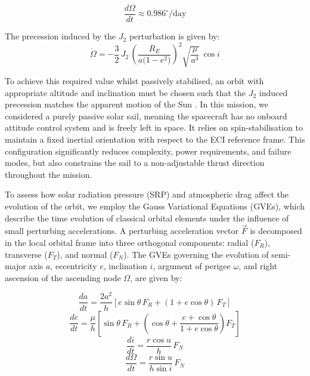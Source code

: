 \documentclass[final,3p,times,twocolumn]{elsarticle}
\begin{document}
\begin{equation}
\frac{d\Omega}{dt} \approx 0.986^\circ/\text{day}
\label{eq:RAANrate}
\end{equation}

\noindent The precession induced by the \( J_2 \) perturbation is given by:
\begin{equation}
\dot{\Omega}
  = -\frac{3}{2}\,J_2\,
      \left(\frac{R_{E}}{a\bigl(1-e^{2}\bigr)}\right)^{\!2}
      \sqrt{\frac{\mu}{a^{3}}}\,
      \cos i
\end{equation}

\noindent To achieve this required value whilst passively stabilised, an orbit with appropriate altitude and inclination must be chosen such that the \( J_2 \) induced precession matches the apparent motion of the Sun \citep{montenbruck2000}. In this mission, we considered a purely passive solar sail, meaning the spacecraft has no onboard attitude control system and is freely left in space. It relies on spin-stabilisation to maintain a fixed inertial orientation with respect to the ECI reference frame. This configuration significantly reduces complexity, power requirements, and failure modes, but also constrains the sail to a non-adjustable thrust direction throughout the mission.

\vspace{5pt}
\par\noindent To assess how solar radiation pressure (SRP) and atmospheric drag affect the evolution of the orbit, we employ the Gauss Variational Equations (GVEs), which describe the time evolution of classical orbital elements under the influence of small perturbing accelerations. A perturbing acceleration vector \( \vec{F} \) is decomposed in the local orbital frame into three orthogonal components: radial (\( F_R \)), transverse (\( F_T \)), and normal (\( F_N \)). The GVEs governing the evolution of semi-major axis \( a \), eccentricity \( e \), inclination \( i \), argument of perigee \( \omega \), and right ascension of the ascending node \( \Omega \), are given by:

\begin{equation}
\frac{da}{dt} = \frac{2a^2}{h} \left[ e \sin{\theta} \, F_R + (1 + e \cos{\theta}) \, F_T \right]
\label{eq:da}
\end{equation}
\begin{equation}
\frac{de}{dt} = \frac{\mu}{h} \left[ \sin{\theta} \, F_R + \left( \cos{\theta} + \frac{e + \cos{\theta}}{1 + e \cos{\theta}} \right) F_T \right]
\end{equation}
\begin{equation}
\frac{di}{dt} = \frac{r \cos{u}}{h} \, F_N
\label{eq:di}
\end{equation}
\begin{equation}
\frac{d\Omega}{dt} = \frac{r \sin{u}}{h \sin{i}} \, F_N
\label{eq:domega}
\end{equation}
\end{document}
